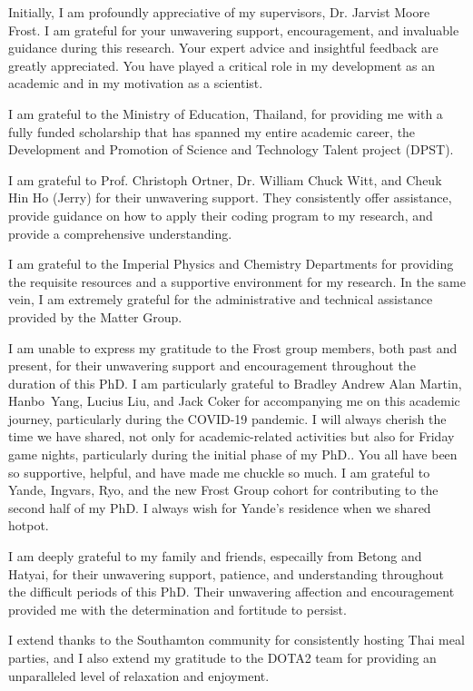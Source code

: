 Initially, I am profoundly appreciative of my supervisors, Dr. Jarvist Moore Frost.  I am grateful for your unwavering support, encouragement, and invaluable guidance during this research.  Your expert advice and insightful feedback are greatly appreciated.
You have played a critical role in my development as an academic and in my motivation as a scientist.

I am grateful to the Ministry of Education, Thailand, for providing me with a fully funded scholarship that has spanned my entire academic career, the Development and Promotion of Science and Technology Talent project (DPST). 

I am grateful to Prof. Christoph Ortner, Dr. William Chuck Witt, and Cheuk Hin Ho (Jerry) for their unwavering support.  They consistently offer assistance, provide guidance on how to apply their coding program to my research, and provide a comprehensive understanding.

I am grateful to the Imperial Physics and Chemistry Departments for providing the requisite resources and a supportive environment for my research.  In the same vein, I am extremely grateful for the administrative and technical assistance provided by the Matter Group. 

I am unable to express my gratitude to the Frost group members, both past and present, for their unwavering support and encouragement throughout the duration of this PhD.  I am particularly grateful to Bradley Andrew Alan Martin, Hanbo~Yang, Lucius Liu, and Jack Coker for accompanying me on this academic journey, particularly during the COVID-19 pandemic.  I will always cherish the time we have shared, not only for academic-related activities but also for Friday game nights, particularly during the initial phase of my PhD..  You all have been so supportive, helpful, and have made me chuckle so much.  I am grateful to Yande, Ingvars, Ryo, and the new Frost Group cohort for contributing to the second half of my PhD. I always wish for Yande's residence when we shared hotpot. 

I am deeply grateful to my family and friends, especailly from Betong and Hatyai, for their unwavering support, patience, and understanding throughout the difficult periods of this PhD. Their unwavering affection and encouragement provided me with the determination and fortitude to persist. 

I extend thanks to the Southamton community for consistently hosting Thai meal parties, and I also extend my gratitude to the DOTA2 team for providing an unparalleled level of relaxation and enjoyment.

